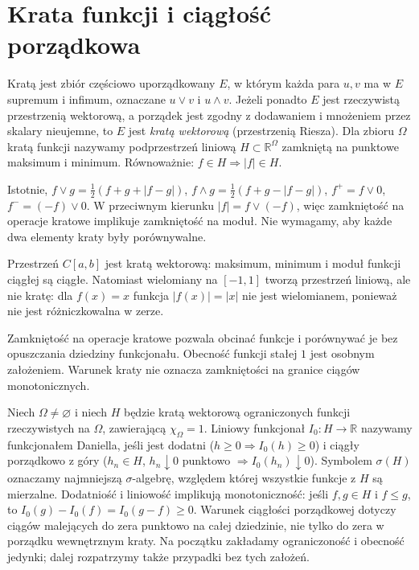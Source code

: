 \section{Krata funkcji i ciągłość porządkowa}
\begin{definicja}\label{it:def:daniell-lattice}
Kratą jest zbiór częściowo uporządkowany $E$, w którym każda para $u,v$ ma w $E$ supremum i infimum, oznaczane $u\vee v$ i $u\wedge v$. Jeżeli ponadto $E$ jest rzeczywistą przestrzenią wektorową, a porządek jest zgodny z dodawaniem i mnożeniem przez skalary nieujemne, to $E$ jest \emph{kratą wektorową} (przestrzenią Riesza). Dla zbioru $\Omega$ kratą funkcji nazywamy podprzestrzeń liniową $H\subset\mathbb{R}^\Omega$ zamkniętą na punktowe maksimum i minimum. Równoważnie: $f\in H\Rightarrow|f|\in H$.
\end{definicja}
Istotnie, $f\vee g=\tfrac12(f+g+|f-g|)$, $f\wedge g=\tfrac12(f+g-|f-g|)$, $f^+=f\vee0$, $f^-=(-f)\vee0$. W przeciwnym kierunku $|f|=f\vee(-f)$, więc zamkniętość na operacje kratowe implikuje zamkniętość na moduł. Nie wymagamy, aby każde dwa elementy kraty były porównywalne.
\begin{przyklad}
Przestrzeń $C[a,b]$ jest kratą wektorową: maksimum, minimum i moduł funkcji ciągłej są ciągłe. Natomiast wielomiany na $[-1,1]$ tworzą przestrzeń liniową, ale nie kratę: dla $f(x)=x$ funkcja $|f(x)|=|x|$ nie jest wielomianem, ponieważ nie jest różniczkowalna w zerze.
\end{przyklad}
\begin{uwaga}
Zamkniętość na operacje kratowe pozwala obcinać funkcje i porównywać je bez opuszczania dziedziny funkcjonału. Obecność funkcji stałej $1$ jest osobnym założeniem. Warunek kraty nie oznacza zamkniętości na granice ciągów monotonicznych.
\end{uwaga}
\begin{definicja}
\label{it:def:daniell-functional}
Niech $\Omega\ne\varnothing$ i niech $H$ będzie kratą wektorową ograniczonych funkcji rzeczywistych na $\Omega$, zawierającą $\chi_\Omega=1$. Liniowy funkcjonał $I_0:H\to\mathbb{R}$ nazywamy funkcjonałem Daniella, jeśli jest dodatni ($h\ge0\Rightarrow I_0(h)\ge0$) i ciągły porządkowo z góry ($h_n\in H$, $h_n\downarrow0$ punktowo $\Rightarrow I_0(h_n)\downarrow0$). Symbolem $\sigma(H)$ oznaczamy najmniejszą $\sigma$-algebrę, względem której wszystkie funkcje z $H$ są mierzalne. Dodatniość i liniowość implikują monotoniczność: jeśli $f,g\in H$ i $f\le g$, to $I_0(g)-I_0(f)=I_0(g-f)\ge0$. Warunek ciągłości porządkowej dotyczy ciągów malejących do zera punktowo na całej dziedzinie, nie tylko do zera w porządku wewnętrznym kraty. Na początku zakładamy ograniczoność i obecność jedynki; dalej rozpatrzymy także przypadki bez tych założeń.
\end{definicja}
